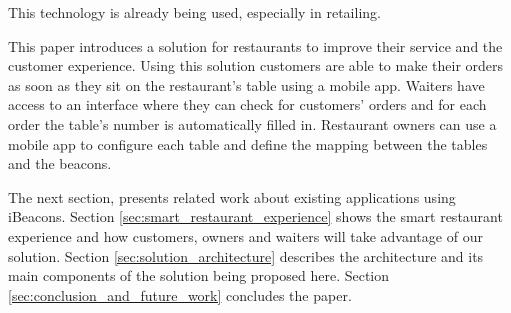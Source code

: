 This technology is already being used, especially in retailing.

This paper introduces a solution for restaurants to improve their
service and the customer experience. Using this solution customers
are able to make their orders as soon as they sit on
the restaurant's table using a mobile app.
Waiters have access to an interface where they can check for customers'
orders and for each order the table's number is automatically filled in.
Restaurant owners can use a mobile app to configure each table and define the
mapping between the tables
and the beacons.

The next section, presents related work about existing applications using
iBeacons.
Section \ref{sec:smart_restaurant_experience} shows the smart restaurant
experience and how customers, owners and waiters will take advantage of our
solution. Section \ref{sec:solution_architecture} describes the architecture
and its main components
of the solution being proposed here.
Section \ref{sec:conclusion_and_future_work} concludes the paper.
